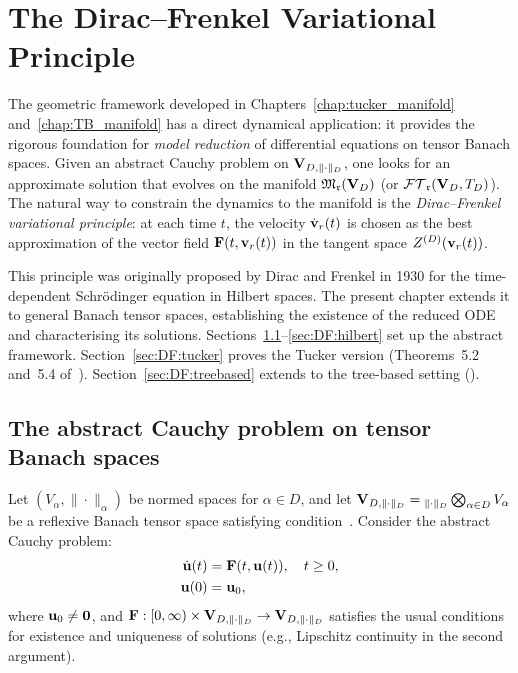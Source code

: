 %
%

\chapter{The Dirac--Frenkel Variational Principle}
\label{chap:DF}

The geometric framework developed in Chapters~\ref{chap:tucker_manifold}
and~\ref{chap:TB_manifold} has a direct dynamical application: it
provides the rigorous foundation for \emph{model reduction} of
differential equations on tensor Banach spaces. Given an abstract
Cauchy problem on $\mathbf{V}_{D,\|\cdot\|_D}$, one looks for an approximate solution
that evolves on the manifold $\mathfrak{M}_{\mathfrak{r}}(\mathbf{V}_D)$ (or $\mathcal{FT}_{\mathfrak{r}}(\mathbf{V}_D,T_D)$).
The natural way to constrain the dynamics to the manifold is the
\emph{Dirac--Frenkel variational principle}: at each time $t$, the
velocity $\dot{\mathbf{v}}_r(t)$ is chosen as the best approximation of the
vector field $\mathbf{F}(t, \mathbf{v}_r(t))$ in the tangent space $Z^{(D)}(\mathbf{v}_r(t))$.

This principle was originally proposed by Dirac and Frenkel in 1930 for
the time-dependent Schrödinger equation in Hilbert spaces. The present
chapter extends it to general Banach tensor spaces, establishing the
existence of the reduced ODE and characterising its solutions.
Sections~\ref{sec:DF:cauchy}--\ref{sec:DF:hilbert} set up the
abstract framework. Section~\ref{sec:DF:tucker} proves the Tucker
version (Theorems~5.2 and~5.4 of~\cite{FHN2019}).
Section~\ref{sec:DF:treebased} extends to the tree-based setting
(\cite{FHN2023}).

\section{The abstract Cauchy problem on tensor Banach spaces}
\label{sec:DF:cauchy}

Let $(V_\alpha, \|\cdot\|_\alpha)$ be normed spaces for $\alpha \in D$,
and let $\mathbf{V}_{D,\|\cdot\|_D} = {}_{\|\cdot\|_D}\bigotimes_{\alpha \in D} V_\alpha$
be a reflexive Banach tensor space satisfying condition~\condINJ.
Consider the abstract Cauchy problem:
\begin{align}
    \dot{\mathbf{u}}(t) &= \mathbf{F}(t, \mathbf{u}(t)), \quad t \geq 0,
    \label{eq:DF:ode} \\
    \mathbf{u}(0) &= \mathbf{u}_0,
    \label{eq:DF:ic}
\end{align}
where $\mathbf{u}_0 \neq \mathbf{0}$, and $\mathbf{F}: [0, \infty) \times \mathbf{V}_{D,\|\cdot\|_D}
\to \mathbf{V}_{D,\|\cdot\|_D}$ satisfies the usual conditions for existence and uniqueness
of solutions (e.g., Lipschitz continuity in the second argument).

